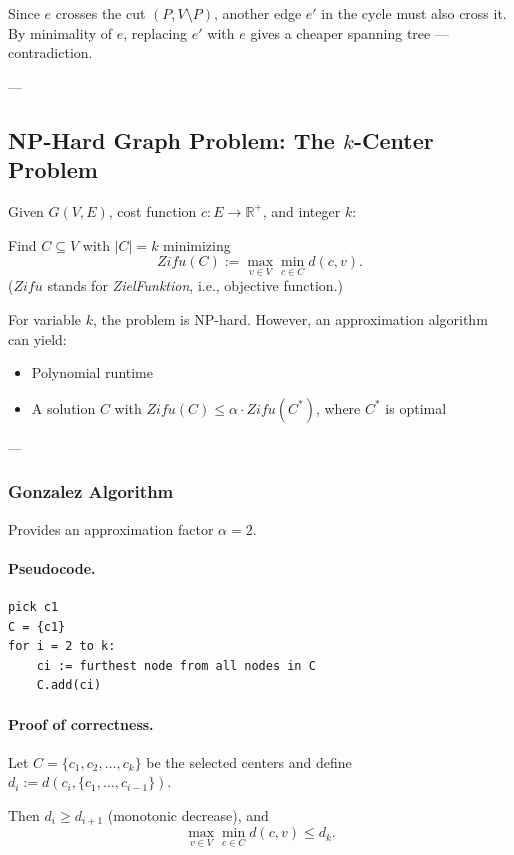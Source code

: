 \documentclass{article}
\begin{document}
Since $e$ crosses the cut $(P, V \setminus P)$, another edge $e'$ in the cycle must also cross it.  
By minimality of $e$, replacing $e'$ with $e$ gives a cheaper spanning tree — contradiction.

---

\subsection{NP-Hard Graph Problem: The $k$-Center Problem}

Given $G(V,E)$, cost function $c: E \to \mathbb{R}^+$, and integer $k$:

Find $C \subseteq V$ with $|C| = k$ minimizing
\[
Zifu(C) := \max_{v \in V} \min_{c \in C} d(c,v).
\]
($Zifu$ stands for \emph{ZielFunktion}, i.e., objective function.)

For variable $k$, the problem is NP-hard.  
However, an approximation algorithm can yield:

\begin{itemize}
    \item Polynomial runtime
    \item A solution $C$ with $Zifu(C) \leq \alpha \cdot Zifu(C^*)$, where $C^*$ is optimal
\end{itemize}

---

\subsubsection{Gonzalez Algorithm}

Provides an approximation factor $\alpha = 2$.

\paragraph{Pseudocode.}
\begin{verbatim}
pick c1
C = {c1}
for i = 2 to k:
    ci := furthest node from all nodes in C
    C.add(ci)
\end{verbatim}

\paragraph{Proof of correctness.}

Let $C = \{c_1, c_2, \dots, c_k\}$ be the selected centers and define  
$d_i := d(c_i, \{c_1, \dots, c_{i-1}\})$.

Then $d_i \geq d_{i+1}$ (monotonic decrease), and  
\[
\max_{v \in V} \min_{c \in C} d(c,v) \leq d_k.
\]
\end{document}
